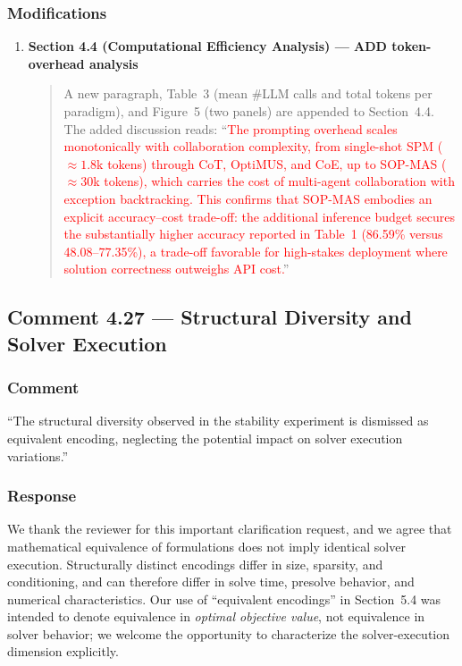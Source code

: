 \documentclass[11pt,a4paper]{article}
\begin{document}
\subsubsection{Modifications}
\begin{enumerate}
\item \textbf{Section 4.4 (Computational Efficiency Analysis) --- ADD token-overhead analysis}
\begin{quote}
A new paragraph, Table~3 (mean \#LLM calls and total tokens per paradigm), and Figure~5 (two panels) are appended to Section~4.4. The added discussion reads: ``\textcolor{red}{The prompting overhead scales monotonically with collaboration complexity, from single-shot SPM (${\approx}1.8$k tokens) through CoT, OptiMUS, and CoE, up to SOP-MAS (${\approx}30$k tokens), which carries the cost of multi-agent collaboration with exception backtracking. This confirms that SOP-MAS embodies an explicit accuracy--cost trade-off: the additional inference budget secures the substantially higher accuracy reported in Table~1 (86.59\% versus 48.08--77.35\%), a trade-off favorable for high-stakes deployment where solution correctness outweighs API cost.}''
\end{quote}
\end{enumerate}

\subsection{Comment 4.27 --- Structural Diversity and Solver Execution}

\subsubsection{Comment}
``The structural diversity observed in the stability experiment is dismissed as equivalent encoding, neglecting the potential impact on solver execution variations.''

\subsubsection{Response}
We thank the reviewer for this important clarification request, and we agree that mathematical equivalence of formulations does not imply identical solver execution. Structurally distinct encodings differ in size, sparsity, and conditioning, and can therefore differ in solve time, presolve behavior, and numerical characteristics. Our use of ``equivalent encodings'' in Section~5.4 was intended to denote equivalence in \emph{optimal objective value}, not equivalence in solver behavior; we welcome the opportunity to characterize the solver-execution dimension explicitly.
\end{document}
